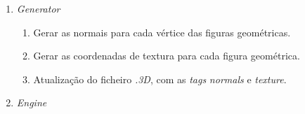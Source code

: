 \documentclass[runningheads]{llncs}
\begin{document}
    \begin{enumerate}
        \item \textit{Generator}
        \begin{enumerate}
            \item Gerar as normais para cada vértice das figuras geométricas.
            \item Gerar as coordenadas de textura para cada figura geométrica.
            \item Atualização do ficheiro \textit{.3D}, com as \textit{tags} 
                  \textit{normals} e \textit{texture}.
        \end{enumerate}
        \item \textit{Engine}
    \end{enumerate}
    
    
    
    
    

    
\end{document}
